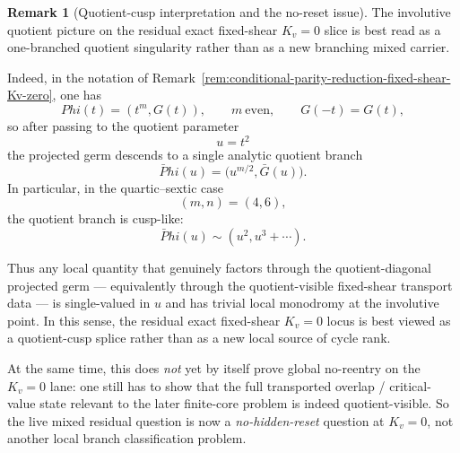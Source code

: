 \documentclass[11pt,a4paper]{amsart}
\def\Phi{Phi}%
\theoremstyle{plain}
\theoremstyle{definition}
\newtheorem{remark}[theorem]{Remark}
\begin{document}
\begin{remark}[Quotient-cusp interpretation and the no-reset issue]
\label{rem:quotient-cusp-interpretation-no-reset-Kv-zero}
The involutive quotient picture on the residual exact fixed-shear
$K_v=0$ slice is best read as a one-branched quotient singularity rather than
as a new branching mixed carrier.

Indeed, in the notation of
Remark~\ref{rem:conditional-parity-reduction-fixed-shear-Kv-zero}, one has
\[
\Phi(t)=(t^m,G(t)),
\qquad
m\ \text{even},
\qquad
G(-t)=G(t),
\]
so after passing to the quotient parameter
\[
u=t^2
\]
the projected germ descends to a single analytic quotient branch
\[
\bar\Phi(u)=\bigl(u^{m/2},\bar G(u)\bigr).
\]
In particular, in the quartic--sextic case
\[
(m,n)=(4,6),
\]
the quotient branch is cusp-like:
\[
\bar\Phi(u)\sim (u^2,u^3+\cdots).
\]

Thus any local quantity that genuinely factors through the quotient-diagonal
projected germ --- equivalently through the quotient-visible fixed-shear
transport data --- is single-valued in $u$ and has trivial local monodromy at
the involutive point. In this sense, the residual exact fixed-shear
$K_v=0$ locus is best viewed as a quotient-cusp splice rather than as a new
local source of cycle rank.

At the same time, this does \emph{not} yet by itself prove global no-reentry on
the $K_v=0$ lane: one still has to show that the full transported overlap /
critical-value state relevant to the later finite-core problem is indeed
quotient-visible. So the live mixed residual question is now a
\emph{no-hidden-reset} question at $K_v=0$, not another local branch
classification problem.
\end{remark}
\end{document}
